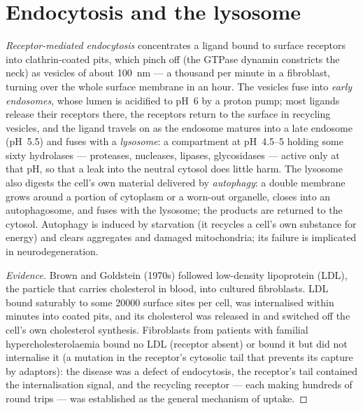 \section{Endocytosis and the lysosome}

\begin{definition}[Endocytosis]\label{def:b3:membrane-traffic:endocytosis}
\emph{Receptor-mediated endocytosis} concentrates a ligand bound to
surface receptors into clathrin-coated pits, which pinch off (the
GTPase dynamin constricts the neck) as vesicles of about \qty{100}{nm}
--- a thousand per minute in a fibroblast, turning over the whole
surface membrane in an hour. The vesicles fuse into \emph{early
endosomes}, whose lumen is acidified to pH~6 by a proton pump; most
ligands release their receptors there, the receptors return to the
surface in recycling vesicles, and the ligand travels on as the
endosome matures into a late endosome (pH~5.5) and fuses with a
\emph{lysosome}: a compartment at pH~4.5--5 holding some sixty
hydrolases --- proteases, nucleases, lipases, glycosidases --- active
only at that pH, so that a leak into the neutral cytosol does little
harm. The lysosome also digests the cell's own material delivered by
\emph{autophagy}: a double membrane grows around a portion of cytoplasm
or a worn-out organelle, closes into an autophagosome, and fuses with
the lysosome; the products are returned to the cytosol. Autophagy is
induced by starvation (it recycles a cell's own substance for energy)
and clears aggregates and damaged mitochondria; its failure is
implicated in neurodegeneration.
\end{definition}

\begin{proof}[Evidence]
Brown and Goldstein (1970s) followed low-density lipoprotein (LDL),
the particle that carries cholesterol in blood, into cultured
fibroblasts. LDL bound saturably to some \num{20000} surface sites per
cell, was internalised within minutes into coated pits, and its
cholesterol was released in  and switched off the cell's own
cholesterol synthesis. Fibroblasts from patients with familial
hypercholesterolaemia bound no LDL (receptor absent) or bound it but
did not internalise it (a mutation in the receptor's cytosolic tail
that prevents its capture by  adaptors): the disease was a
defect of endocytosis, the receptor's tail contained the internalisation
signal, and the recycling receptor --- each making hundreds of round
trips --- was established as the general mechanism of uptake.
\end{proof}

